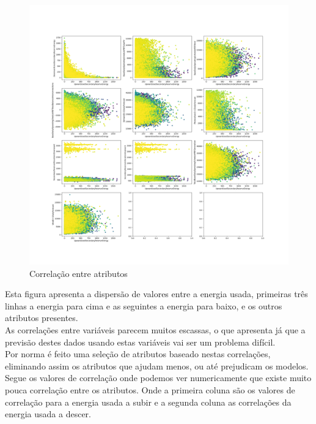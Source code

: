 \begin{figure}[H]
  \centering
  \includegraphics[width=\textwidth]{plots/feature_correlation.png}
  \caption{Correlação entre atributos}
  \label{fig:featurecorrelation}
\end{figure}

Esta figura apresenta a dispersão de valores entre a energia usada, primeiras três linhas a energia para cima e as seguintes a energia para baixo, e os outros atributos presentes.\\
As correlações entre variáveis parecem muitos escassas, o que apresenta já que a previsão destes dados usando estas variáveis vai ser um problema difícil.\\
Por norma é feito uma seleção de atributos baseado nestas correlações, eliminando assim os atributos que ajudam menos, ou até prejudicam os modelos.\\
Segue os valores de correlação onde podemos ver numericamente que existe muito pouca correlação entre os atributos. Onde a primeira coluna são os valores de correlação para a energia usada a subir e a segunda coluna as correlações da energia usada a descer.\\

